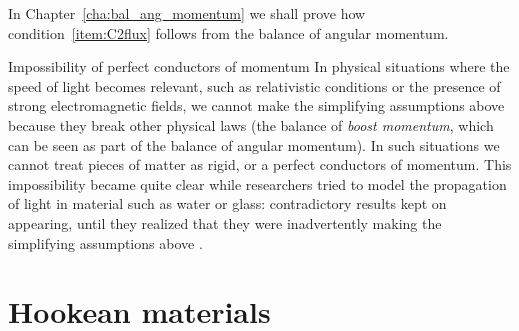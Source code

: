 \documentclass[a4paper,12pt,%
onecolumn,oneside,%
british%
]{memoir}
\renewcommand*{\bm}[1]{\textpdfrender{TextRenderingMode=2,LineWidth=0.2pt}{\boldsymbol{#1}}}
\newcommand*{\di}{\mathrm{d}}%
\renewcommand*{\|}[1][]{\nonscript\:#1\vert\nonscript\:\mathopen{}}
\newcommand*{\chap}{Chapter}%
\newcommand*{\masse}{mass-energy}
\newcommand*{\dt}{\di t}
\newcommand*{\yP}{\bm{P}}
\newcommand*{\yF}{\bm{F}}
\newcommand*{\yFa}{\yF_{a}}
\newcommand*{\yFb}{\yF_{b}}
\newcommand*{\yG}{\bm{G}}
\begin{document}
% 

In \chap~\ref{cha:bal_ang_momentum} we shall prove how condition~\ref{item:C2flux} follows from the balance of angular momentum.

\begin{extra}{Impossibility of perfect conductors of momentum}
In physical situations where the speed of light becomes relevant, such as relativistic conditions or the presence of strong electromagnetic fields, we cannot make the simplifying assumptions above because they break other physical laws (the balance of \emph{boost momentum}, which can be seen as part of the balance of angular momentum). In such situations we cannot treat pieces of matter as rigid, or a perfect conductors of momentum. This impossibility became quite clear while researchers tried to model the propagation of light in material such as water or glass: contradictory results kept on appearing, until they realized that they were inadvertently making the simplifying assumptions above \autocites{pfeiferetal2007}.
\end{extra}

\section{Hookean materials}
\label{sec:hooke}
\end{document}
